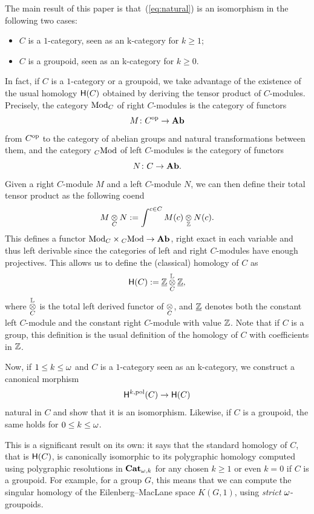 The main result of this paper is that~(\ref{eq:natural}) is an
isomorphism in the following two cases:
\begin{itemize}
\item $C$ is a $1$-category, seen as an \ook k-category for $k\geq 1$;
  \item $C$ is a groupoid, seen as an \ook k-category for $k\geq 0$.
  \end{itemize}
In fact, if $C$ is a $1$-category or a groupoid,  we take advantage of the existence
of the usual homology $\mathsf{H}(C)$ obtained by deriving the tensor product
of $C$-modules. Precisely, the
category $\mathrm{Mod}_{C}$ of right $C$\nbd-modules is the category of
functors \[M \colon C^{{\mathrm{op}}} \to \mathbf{Ab}\] from $C^{{\mathrm{op}}}$ to the
  category of abelian groups and natural transformations between them,
  and the category ${}_{C}\mathrm{Mod}$ of left $C$\nbd-modules is the category
  of functors \[N \colon C \to \mathbf{Ab}.\] Given a right $C$\nbd-module $M$ and a
  left $C$\nbd-module $N$, we can then define their total tensor
  product as the following coend
  \[
    M \underset{C}{\otimes}N := \int^{c \in C}M(c)\underset{\mathbb Z}{\otimes} N(c).
  \]
  This defines a functor $\mathrm{Mod}_{C}\times {}_{C}\mathrm{Mod} \to \mathbf{Ab}$,
   right exact in each variable and thus left derivable since the
  categories of left and right $C$\nbd-modules have enough
  projectives. This allows us to define the (classical) homology of $C$
  as
  \[
    \mathsf{H}(C):=\underline{\mathbb Z}\overset{\mathbb{L}}{\underset{C}{\otimes}}\underline{\mathbb Z},
  \]
  where $\overset{\mathbb{L}}{\underset{C}{\otimes}}$ is the total left derived functor of $\underset{C}{\otimes}$,
  and $\underline{\mathbb Z}$ denotes both the constant left $C$\nbd-module and the
  constant right
  $C$\nbd-module with value $\mathbb Z$. Note that if $C$ is a
  group, this definition is the usual definition of the homology
  of $C$ with coefficients in $\mathbb Z$.

  Now, if $1\leq k\leq \omega$ and $C$ is a $1$-category seen as an  \ook
  k-category, we construct a canonical morphism
  \begin{equation}
    \label{eq:poltoclassical}
     \mathsf{H}^{k,\mathrm{pol}} (C) \to \mathsf{H}(C)
   \end{equation}
   natural in $C$ and show that it is an
   isomorphism. Likewise, if $C$ is a groupoid, the same holds
   for $0\leq k\leq \omega$.

 This is a significant result on its own: it says that the
  standard homology of $C$, that is $\mathsf{H}(C)$, is canonically
  isomorphic to its polygraphic homology computed using polygraphic
  resolutions in $\mathbf{Cat}_{\omega,k}$ for any chosen $k\geq 1$ or even $k=0$ if $C$ is
  a groupoid. For example, for a group $G$, this means that we can
  compute the singular homology of the Eilenberg--MacLane space
  $K(G,1)$, using \emph{strict} $\omega$\nbd-groupoids.

